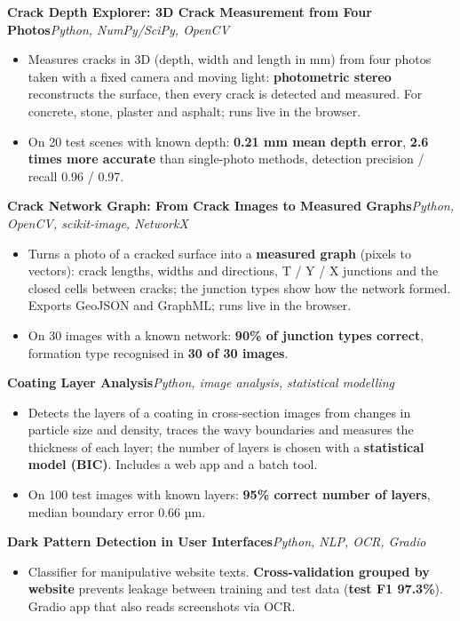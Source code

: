 \documentclass[10pt,a4paper]{article}
\newcommand{\project}[2]{\par\vspace{4pt}\noindent\textbf{#1}\hfill\textit{#2}\par}
\begin{document}
\project{Crack Depth Explorer: 3D Crack Measurement from Four Photos}{Python, NumPy/SciPy, OpenCV}
\begin{itemize}
  \item Measures cracks in 3D (depth, width and length in mm) from four photos taken with a fixed camera and moving light: \textbf{photometric stereo} reconstructs the surface, then every crack is detected and measured. For concrete, stone, plaster and asphalt; runs live in the browser.
  \item On 20 test scenes with known depth: \textbf{0.21 mm mean depth error}, \textbf{2.6 times more accurate} than single-photo methods, detection precision / recall 0.96 / 0.97.
\end{itemize}

\project{Crack Network Graph: From Crack Images to Measured Graphs}{Python, OpenCV, scikit-image, NetworkX}
\begin{itemize}
  \item Turns a photo of a cracked surface into a \textbf{measured graph} (pixels to vectors): crack lengths, widths and directions, T / Y / X junctions and the closed cells between cracks; the junction types show how the network formed. Exports GeoJSON and GraphML; runs live in the browser.
  \item On 30 images with a known network: \textbf{90\% of junction types correct}, formation type recognised in \textbf{30 of 30 images}.
\end{itemize}

\project{Coating Layer Analysis}{Python, image analysis, statistical modelling}
\begin{itemize}
  \item Detects the layers of a coating in cross-section images from changes in particle size and density, traces the wavy boundaries and measures the thickness of each layer; the number of layers is chosen with a \textbf{statistical model (BIC)}. Includes a web app and a batch tool.
  \item On 100 test images with known layers: \textbf{95\% correct number of layers}, median boundary error 0.66 µm.
\end{itemize}

\project{Dark Pattern Detection in User Interfaces}{Python, NLP, OCR, Gradio}
\begin{itemize}
  \item Classifier for manipulative website texts. \textbf{Cross-validation grouped by website} prevents leakage between training and test data (\textbf{test F1 97.3\%}). Gradio app that also reads screenshots via OCR.
\end{itemize}
\end{document}
